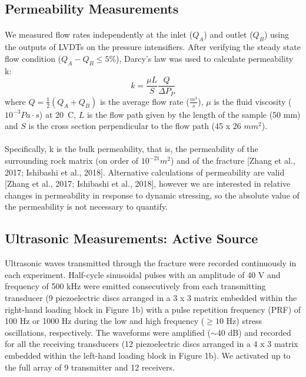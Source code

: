 \documentclass[letterpaper,10pt]{article}
\begin{document}
\subsection{Permeability Measurements}
\paragraph{} We measured flow rates independently at the inlet ($Q_A$) and outlet ($Q_B$) using the outputs of LVDTs on the pressure intensifiers. After verifying the steady state flow condition ($Q_{A} - Q_{B}  \leq 5 \% $), Darcy’s law was
used to calculate permeability k: 
\begin{equation} \label{eq:perm}
k = \frac{\mu L}{S} \frac{Q}{\Delta P_P}
\end{equation}
where $Q = \frac{1}{2} (Q_A + Q_B )$ is the average flow rate ($\frac{m^3}{s}$), $\mu$ is the fluid viscosity ($10^{-3} Pa\cdot s$) at 20\textdegree\ C, $L$ is the flow path given by the length of the sample (50 mm) and $S$ is the cross section perpendicular to the flow path (45 x 26 $mm^2$).
\paragraph{} Specifically, k is the bulk permeability, that is, the permeability of the surrounding rock matrix (on order of $10^{-21} m^2$) and of the fracture [Zhang et al., 2017; Ishibashi et al., 2018]. Alternative calculations of permeability are valid [Zhang et al., 2017; Ishibashi et al., 2018], however we are interested in relative changes in permeability in response to dynamic stressing, so the absolute value of the permeability is not necessary to quantify.


\subsection{Ultrasonic Measurements: Active Source}
Ultrasonic waves transmitted through the fracture were recorded continuously in each experiment. Half-cycle sinusoidal pulses with an amplitude of 40 V and frequency of 500 kHz were emitted consecutively from each transmitting transducer (9 piezoelectric discs arranged in a 3 x 3 matrix embedded within the right-hand loading block in Figure 1b) with a pulse repetition frequency (PRF) of 100 Hz or 1000 Hz during the low and high frequency ($\geq 10$ Hz) stress oscillations, respectively. The waveforms were amplified ($\sim 40$ dB) and recorded for all the receiving transducers (12 piezoelectric discs arranged in a 4 x 3 matrix embedded within the left-hand loading block in Figure 1b). We activated up to the full array of 9 transmitter and 12 receivers. 
\end{document}
